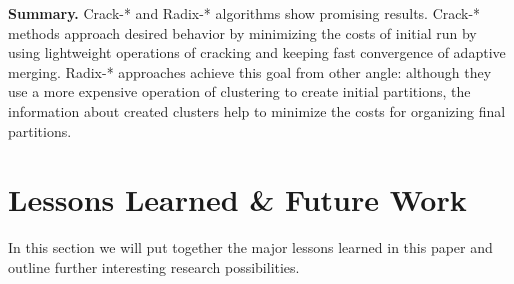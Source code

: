 \documentclass[10pt, conference, compsocconf]{IEEEtran}
\begin{document}
\textbf{Summary.} Crack-* and Radix-* algorithms show promising results. Crack-* methods approach desired behavior by minimizing the costs of initial run by using lightweight operations of cracking and keeping fast convergence of adaptive merging. Radix-* approaches achieve this goal from other angle: although they use a more expensive operation of clustering to create initial partitions, the information about created clusters help to minimize the costs for organizing final partitions.

\section{Lessons Learned \& Future Work}
\label{sec:eval}
In this section we will put together the major lessons learned in this paper and outline further interesting research possibilities.
\end{document}
